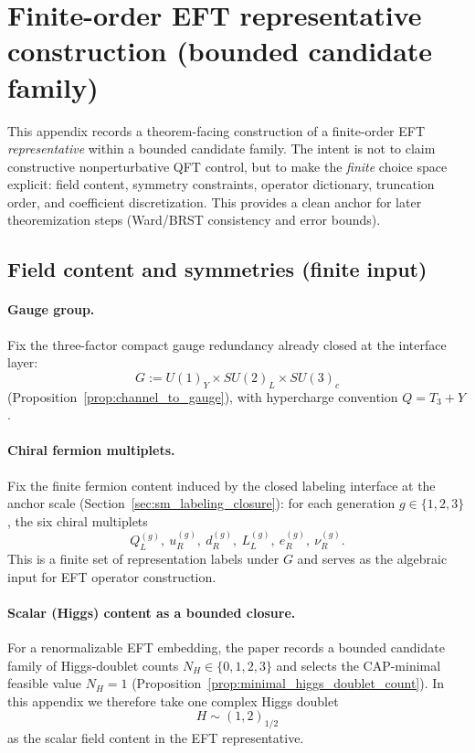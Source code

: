 \section{Finite-order EFT representative construction (bounded candidate family)}
\label{app:eft_representative_construction}

This appendix records a theorem-facing construction of a finite-order EFT \emph{representative} within a bounded candidate family.
The intent is not to claim constructive nonperturbative QFT control, but to make the \emph{finite} choice space explicit:
field content, symmetry constraints, operator dictionary, truncation order, and coefficient discretization.
This provides a clean anchor for later theoremization steps (Ward/BRST consistency and error bounds).

\subsection{Field content and symmetries (finite input)}

\paragraph{Gauge group.}
Fix the three-factor compact gauge redundancy already closed at the interface layer:
\[
G := U(1)_Y\times SU(2)_L\times SU(3)_c
\]
(Proposition~\ref{prop:channel_to_gauge}), with hypercharge convention $Q=T_3+Y$.

\paragraph{Chiral fermion multiplets.}
Fix the finite fermion content induced by the closed labeling interface at the anchor scale (Section~\ref{sec:sm_labeling_closure}):
for each generation $g\in\{1,2,3\}$, the six chiral multiplets
\[
Q_L^{(g)},\ u_R^{(g)},\ d_R^{(g)},\ L_L^{(g)},\ e_R^{(g)},\ \nu_R^{(g)}.
\]
This is a finite set of representation labels under $G$ and serves as the algebraic input for EFT operator construction.

\paragraph{Scalar (Higgs) content as a bounded closure.}
For a renormalizable EFT embedding, the paper records a bounded candidate family of Higgs-doublet counts
$N_H\in\{0,1,2,3\}$ and selects the CAP-minimal feasible value $N_H=1$ (Proposition~\ref{prop:minimal_higgs_doublet_count}).
In this appendix we therefore take one complex Higgs doublet
\[
H \sim (1,2)_{1/2}
\]
as the scalar field content in the EFT representative.

